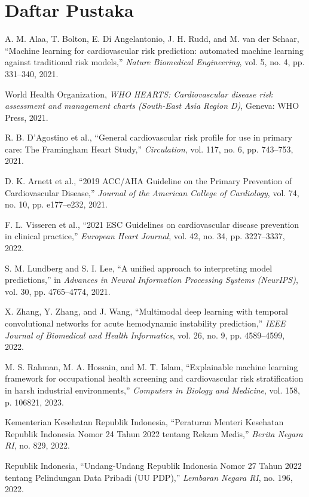 \documentclass[a4paper,11pt]{article}
\begin{document}
\section*{Daftar Pustaka}
\begin{enumerate}[leftmargin=*,label={[\arabic*]}]
    \item A. M. Alaa, T. Bolton, E. Di Angelantonio, J. H. Rudd, and M. van der Schaar, ``Machine learning for cardiovascular risk prediction: automated machine learning against traditional risk models,'' \textit{Nature Biomedical Engineering}, vol. 5, no. 4, pp. 331--340, 2021.
    \item World Health Organization, \textit{WHO HEARTS: Cardiovascular disease risk assessment and management charts (South-East Asia Region D)}, Geneva: WHO Press, 2021.
    \item R. B. D'Agostino et al., ``General cardiovascular risk profile for use in primary care: The Framingham Heart Study,'' \textit{Circulation}, vol. 117, no. 6, pp. 743--753, 2021.
    \item D. K. Arnett et al., ``2019 ACC/AHA Guideline on the Primary Prevention of Cardiovascular Disease,'' \textit{Journal of the American College of Cardiology}, vol. 74, no. 10, pp. e177--e232, 2021.
    \item F. L. Visseren et al., ``2021 ESC Guidelines on cardiovascular disease prevention in clinical practice,'' \textit{European Heart Journal}, vol. 42, no. 34, pp. 3227--3337, 2022.
    \item S. M. Lundberg and S. I. Lee, ``A unified approach to interpreting model predictions,'' in \textit{Advances in Neural Information Processing Systems (NeurIPS)}, vol. 30, pp. 4765--4774, 2021.
    \item X. Zhang, Y. Zhang, and J. Wang, ``Multimodal deep learning with temporal convolutional networks for acute hemodynamic instability prediction,'' \textit{IEEE Journal of Biomedical and Health Informatics}, vol. 26, no. 9, pp. 4589--4599, 2022.
    \item M. S. Rahman, M. A. Hossain, and M. T. Islam, ``Explainable machine learning framework for occupational health screening and cardiovascular risk stratification in harsh industrial environments,'' \textit{Computers in Biology and Medicine}, vol. 158, p. 106821, 2023.
    \item Kementerian Kesehatan Republik Indonesia, ``Peraturan Menteri Kesehatan Republik Indonesia Nomor 24 Tahun 2022 tentang Rekam Medis,'' \textit{Berita Negara RI}, no. 829, 2022.
    \item Republik Indonesia, ``Undang-Undang Republik Indonesia Nomor 27 Tahun 2022 tentang Pelindungan Data Pribadi (UU PDP),'' \textit{Lembaran Negara RI}, no. 196, 2022.
\end{enumerate}
\end{document}
